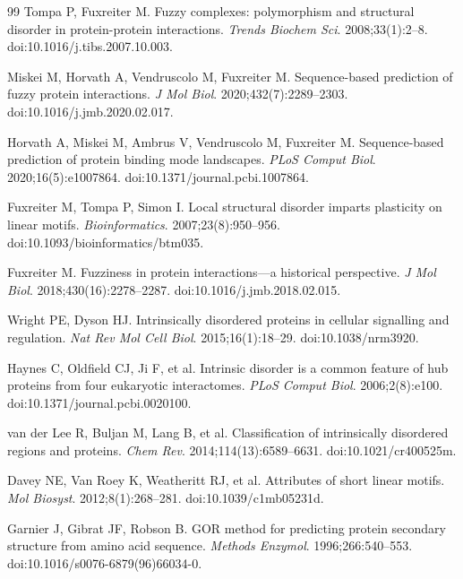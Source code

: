 \documentclass[11pt]{article}
\begin{document}
\begin{thebibliography}{99}
 Tompa P, Fuxreiter M. Fuzzy complexes: polymorphism and structural disorder in protein-protein interactions. \textit{Trends Biochem Sci}. 2008;33(1):2--8. doi:10.1016/j.tibs.2007.10.003.

 Miskei M, Horvath A, Vendruscolo M, Fuxreiter M. Sequence-based prediction of fuzzy protein interactions. \textit{J Mol Biol}. 2020;432(7):2289--2303. doi:10.1016/j.jmb.2020.02.017.

 Horvath A, Miskei M, Ambrus V, Vendruscolo M, Fuxreiter M. Sequence-based prediction of protein binding mode landscapes. \textit{PLoS Comput Biol}. 2020;16(5):e1007864. doi:10.1371/journal.pcbi.1007864.

 Fuxreiter M, Tompa P, Simon I. Local structural disorder imparts plasticity on linear motifs. \textit{Bioinformatics}. 2007;23(8):950--956. doi:10.1093/bioinformatics/btm035.

 Fuxreiter M. Fuzziness in protein interactions---a historical perspective. \textit{J Mol Biol}. 2018;430(16):2278--2287. doi:10.1016/j.jmb.2018.02.015.

 Wright PE, Dyson HJ. Intrinsically disordered proteins in cellular signalling and regulation. \textit{Nat Rev Mol Cell Biol}. 2015;16(1):18--29. doi:10.1038/nrm3920.

 Haynes C, Oldfield CJ, Ji F, et al. Intrinsic disorder is a common feature of hub proteins from four eukaryotic interactomes. \textit{PLoS Comput Biol}. 2006;2(8):e100. doi:10.1371/journal.pcbi.0020100.

 van der Lee R, Buljan M, Lang B, et al. Classification of intrinsically disordered regions and proteins. \textit{Chem Rev}. 2014;114(13):6589--6631. doi:10.1021/cr400525m.

 Davey NE, Van Roey K, Weatheritt RJ, et al. Attributes of short linear motifs. \textit{Mol Biosyst}. 2012;8(1):268--281. doi:10.1039/c1mb05231d.

 Garnier J, Gibrat JF, Robson B. GOR method for predicting protein secondary structure from amino acid sequence. \textit{Methods Enzymol}. 1996;266:540--553. doi:10.1016/s0076-6879(96)66034-0.


\end{thebibliography}
\end{document}
